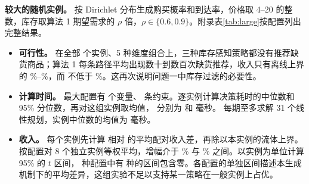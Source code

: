 

\textbf{较大的随机实例。} 按 Dirichlet 分布生成购买概率和到达率，价格取 4--20 的整数，库存取算法 1 期望需求的 $\rho$ 倍，$\rho\in\{0.6,0.9\}$。附录表\ref{tab:large}按配置列出完整结果。
\begin{itemize}
\item \textbf{可行性。} 在全部 \LargeInstances{} 个实例、5 种维度组合上，三种库存感知策略都没有推荐缺货商品；算法 1 每条路径平均出现数十到数百次缺货推荐，收入只有离线上界的 \LargeAlgOneMin\%--\LargeAlgOneMax\%，而 \Greedy{} 不低于 \LargeGreedyMin\%。这再次说明问题一中库存过滤的必要性。
\item \textbf{计算时间。} 最大配置有 \LargeVars{} 个变量、\LargeRows{} 条约束。逐实例计算决策耗时的中位数和 95\% 分位数，再对这组实例取均值，\LPDual{} 分别为 \LargeTimeMedian{} 和 \LargeTimeP{} 毫秒。\LPFD{} 每期至多求解 31 个线性规划，实例中位数的均值为 \LargeTimeFD{} 毫秒。
\item \textbf{收入。} 每个实例先计算 \LPDual{} 相对 \Greedy{} 的平均配对收入差，再除以本实例的流体上界。按配置对 8 个独立实例等权平均，增幅介于 \LargePairMin\% 与 \LargePairMax\% 之间。以实例为单位计算 95\% 的 $t$ 区间，\LargeGroups{} 种配置中有 \LargeIntervalsCoverZero{} 种的区间包含零。各配置的单独区间描述本生成机制下的平均差异，这组实验不足以支持某一策略在一般实例上占优。
\end{itemize}
